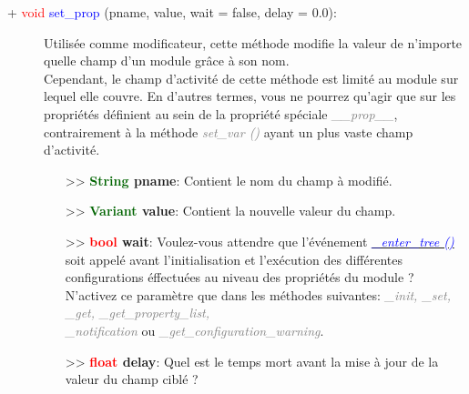 \documentclass[a4paper, 11pt]{article}
\begin{document}
	\begin{description}
		\item [+ \textcolor{red}{void} \textcolor{blue}{set\_prop} (pname, value, wait = false, delay = 
		0.0):] Utilisée comme modificateur, cette méthode modifie la valeur de n'importe quelle champ d'un
		module grâce à son nom. \\Cependant, le champ d'activité de cette méthode est limité au module sur
		lequel elle couvre. En d'autres termes, vous ne pourrez qu'agir que sur les propriétés définient au
		sein de la propriété spéciale \textit{\textcolor{gray}{\_\_prop\_\_}}, contrairement à la méthode
		\textit{\textcolor{gray}{set\_var ()}} ayant un plus vaste champ d'activité.
		\begin{itemize}
			\item [>> \textbf{\textcolor{darkgreen}{String} pname}:] Contient le nom du champ à modifié.
			\item [>> \textbf{\textcolor{darkgreen}{Variant} value}:] Contient la nouvelle valeur du champ.
			\item [>> \textbf{\textcolor{red}{bool} wait}:] Voulez-vous attendre que l'événement
			\href{https://docs.godotengine.org/en/stable/classes/class_node.html#class-node-method-enter-tree}{\textit{\textcolor{blue}{\_enter\_tree ()}}} soit appelé avant l'initialisation et l'exécution des
			différentes configurations éffectuées au niveau des propriétés du module ? \\N'activez ce
			paramètre que dans les méthodes suivantes: \textit{\textcolor{gray}{\_init, \_set, \_get, 
			\_get\_property\_list, \\\_notification}} ou \textit{\textcolor{gray}
			{\_get\_configuration\_warning}}.
			\item [>> \textbf{\textcolor{red}{float} delay}:] Quel est le temps mort avant la mise à jour de 
			la valeur du champ ciblé ?\\
		\end{itemize}
	\end{description}
\end{document}
